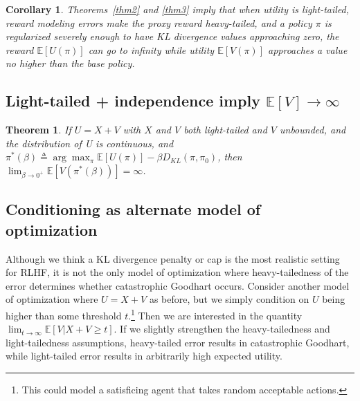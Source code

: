 \documentclass{article}
\newtheorem{theorem}{Theorem}
\begin{document}
\newtheorem{corr}{Corollary}
\begin{corr}
\label{cor:heavy-tailed}
    Theorems~\ref{thm2} and \ref{thm3} imply that when utility is light-tailed, reward modeling errors make the proxy reward heavy-tailed, and a policy $\pi$ is regularized severely enough to have KL divergence values approaching zero, the reward $\mathbb E[U(\pi)]$ can go to infinity while utility $\mathbb E[V(\pi)]$ approaches a value no higher than the base policy.
\end{corr}

\hypertarget{light-tails-independence-imply-mathbb-ev-to-infty}{%
\subsection{\texorpdfstring{Light-tailed + independence imply
\(\mathbb E[V] \to \infty\)}{Light-tailed + independence imply \textbackslash mathbb EV \textbackslash to \textbackslash infty}}\label{light-tails-independence-imply-mathbb-ev-to-infty}}
 
\begin{theorem}
\label{thm4} If \(U=X+V\) with \(X\) and \(V\) both
light-tailed and \(V\) unbounded, and the distribution of U is continuous, and
\(\pi^*(\beta) \triangleq \arg \max_\pi \mathbb E[U(\pi)] - \beta D_{KL}(\pi, \pi_0)\),
then \(\lim_{\beta \to 0^+} \mathbb E[V(\pi^*(\beta))] = \infty\).
\end{theorem}

\subsection{Conditioning as alternate model of optimization\label{sec:theoretical-conditioning}}

Although we think a KL divergence penalty or cap is the most realistic setting for RLHF, it is not the only model of optimization where heavy-tailedness of the error determines whether catastrophic Goodhart occurs. Consider another model of optimization where $U = X+V$ as before, but we simply condition on $U$ being higher than some threshold $t$.\footnote{This could model a satisficing agent that takes random acceptable actions.} Then we are interested in the quantity $\lim_{t \to \infty} \mathbb E[V | X + V \ge t]$. If we slightly strengthen the heavy-tailedness and light-tailedness assumptions, heavy-tailed error results in catastrophic Goodhart, while light-tailed error results in arbitrarily high expected utility.
\end{document}
